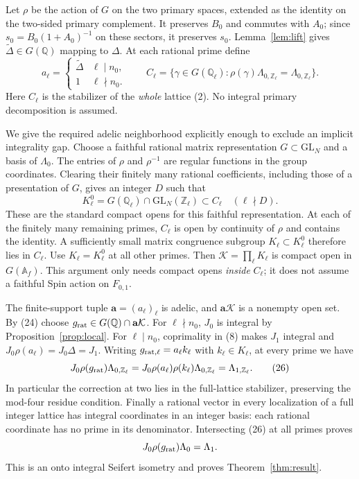 \documentclass[11pt]{article}
\newcommand{\Q}{\mathbb Q}
\newcommand{\Z}{\mathbb Z}
\begin{document}
Let \(\rho\) be the action of \(G\) on the two primary spaces,
extended as the identity on the two-sided primary complement.
It preserves \(B_0\) and commutes with \(A_0\); since
\(s_0=B_0(1+A_0)^{-1}\) on these sectors, it preserves \(s_0\).
Lemma~\ref{lem:lift} gives
\(\widetilde\Delta\in G(\Q)\) mapping to \(\Delta\).
At each rational prime define
\[
 a_\ell=\begin{cases}\widetilde\Delta&\ell\mid n_0,\\1&\ell\nmid n_0.
 \end{cases}
 \qquad
 C_\ell=\{\gamma\in G(\Q_\ell):
       \rho(\gamma)\Lambda_{0,\Z_\ell}=\Lambda_{0,\Z_\ell}\}.
                                                               \tag{25}
\]
Here \(C_\ell\) is the stabilizer of the \emph{whole} lattice (2).
No integral primary decomposition is assumed.

We give the required adelic neighborhood explicitly enough to
exclude an implicit integrality gap. Choose a faithful rational
matrix representation \(G\subset\mathrm{GL}_N\) and a basis
of \(\Lambda_0\). The entries of \(\rho\) and \(\rho^{-1}\)
are regular functions in the group coordinates. Clearing their
finitely many rational coefficients, including those of a
presentation of \(G\), gives an integer \(D\) such that
\[
 K_\ell^0=G(\Q_\ell)\cap\mathrm{GL}_N(\Z_\ell)\subset C_\ell
 \quad(\ell\nmid D).
 \]
These are the standard compact opens for this faithful
representation. At each of the finitely many remaining primes,
\(C_\ell\) is open by continuity of \(\rho\) and contains the
identity. A sufficiently small matrix congruence subgroup
\(K_\ell\subset K_\ell^0\) therefore lies in \(C_\ell\).
Use \(K_\ell=K_\ell^0\) at all other primes. Then
\(\mathcal K=\prod_\ell K_\ell\) is compact open in \(G(\mathbb A_f)\).
This argument only needs compact opens \emph{inside} \(C_\ell\);
it does not assume a faithful Spin action on \(F_{0,1}\).

The finite-support tuple \(\mathbf a=(a_\ell)_\ell\) is adelic,
and \(\mathbf a\mathcal K\) is a nonempty open set. By (24)
choose \(g_{\rm rat}\in G(\Q)\cap\mathbf a\mathcal K\).
For \(\ell\nmid n_0\), \(J_0\) is integral by
Proposition~\ref{prop:local}. For \(\ell\mid n_0\),
coprimality in (8) makes \(J_1\) integral and
\(J_0\rho(a_\ell)=J_0\Delta=J_1\).
Writing \(g_{{\rm rat},\ell}=a_\ell k_\ell\) with \(k_\ell\in K_\ell\),
at every prime we have
\[
 J_0\rho(g_{\rm rat})\Lambda_{0,\Z_\ell}
     =J_0\rho(a_\ell)\rho(k_\ell)\Lambda_{0,\Z_\ell}
     =\Lambda_{1,\Z_\ell}.                                    \tag{26}
\]
In particular the correction at two lies in the full-lattice
stabilizer, preserving the mod-four residue condition.
Finally a rational vector in every localization of a full
integer lattice has integral coordinates in an integer basis:
each rational coordinate has no prime in its denominator.
Intersecting (26) at all primes proves
\[
                    J_0\rho(g_{\rm rat})\Lambda_0=\Lambda_1.
 \]
This is an onto integral Seifert isometry and proves
Theorem~\ref{thm:result}.
\end{document}

